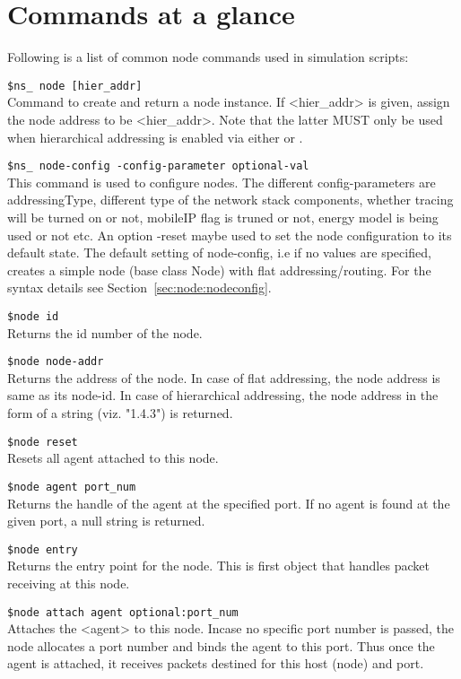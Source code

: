 \section{Commands at a glance}
\label{sec:nodescommand}
\begin{flushleft}

Following is a list of common node commands used in simulation scripts:

{\tt \$ns\_ node [\<hier\_addr\>]}\\ %
Command to create and return a node instance. If <hier\_addr> is given,
assign the node address to be <hier\_addr>. Note that the latter MUST
only be used when hierarchical addressing is enabled via either
 or 
. 

{\tt \$ns\_ node-config -\<config-parameter\> \<optional-val\>}\\%
This command is used to configure nodes. The different config-parameters
are addressingType, different type of the network stack components,
whether tracing will be turned on or not, mobileIP flag is truned or not,
energy model is being used or not etc. An option -reset maybe used to set
the node configuration to its default state. The default setting of 
node-config, i.e if no values are specified, creates a simple node (base
class Node) with flat addressing/routing. For the syntax details see
Section~\ref{sec:node:nodeconfig}.

{\tt \$node id}\\%
Returns the id number of the node.

{\tt \$node node-addr}\\%
Returns the address of the node. In case of flat addressing, the node address
is same as its node-id. In case of hierarchical addressing, the node address
in the form of a string (viz. "1.4.3") is returned.

{\tt \$node reset} \\%
Resets all agent attached to this node.

{\tt \$node agent \<port\_num\>} \\%
Returns the handle of the agent at the specified port. If no agent is found
at the given port, a null string is returned.

{\tt \$node entry}\\%
Returns the entry point for the node. This is first object that
handles packet receiving at this node.

{\tt \$node attach \<agent\> \<optional:port\_num\>}\\%
Attaches the <agent> to this node. Incase no specific port number is passed,
the node allocates a port number and binds the agent to this port. Thus once
the agent is attached, it receives packets destined for this host
(node) and port. 


\end{flushleft}
